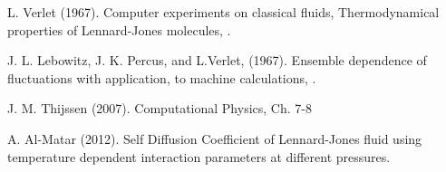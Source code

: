\documentclass[twoside]{article}
\begin{document}
%	
%
%


\begin{thebibliography}{1}
	L.   Verlet  (1967). 
	\newblock Computer  experiments   on   classical   fluids, 
	\newblock Thermodynamical properties of Lennard-Jones molecules,
	.
	
	J. L. Lebowitz, J. K. Percus, and L.Verlet, (1967).
	\newblock Ensemble dependence of fluctuations with application,
	to machine calculations,
	.
	
	J. M. Thijssen (2007).
	\newblock Computational Physics, Ch. 7-8
	
	A. Al-Matar (2012).
	\newblock Self Diffusion Coefficient of Lennard-Jones fluid using temperature dependent interaction parameters at different pressures.
\end{thebibliography}
	
\end{document}

